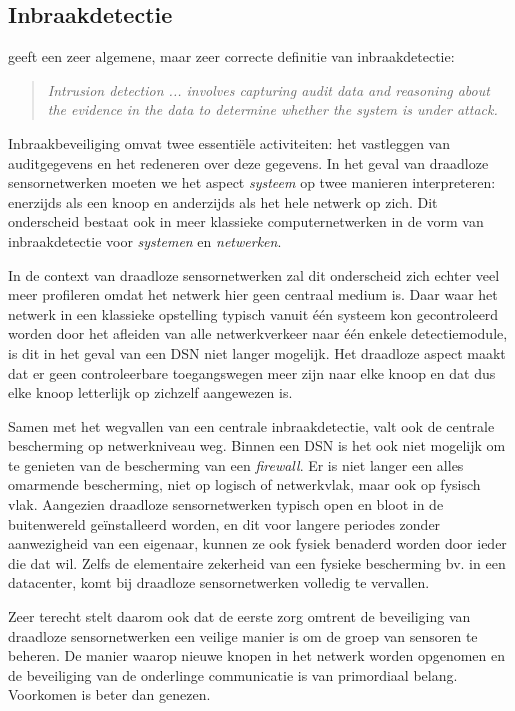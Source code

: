 \subsection{Inbraakdetectie}

\citep{zhang2000intrusion} geeft een zeer algemene, maar zeer correcte
definitie van inbraakdetectie:

\begin{quote}
\emph{Intrusion detection ... involves capturing audit data and reasoning about
the evidence in the data to determine whether the system is under attack.}
\end{quote}

Inbraakbeveiliging omvat twee essenti\"ele activiteiten: het vastleggen van
auditgegevens en het redeneren over deze gegevens. In het geval van draadloze
sensornetwerken moeten we het aspect \emph{systeem} op twee manieren
interpreteren: enerzijds als een knoop en anderzijds als het hele netwerk op
zich. Dit onderscheid bestaat ook in meer klassieke computernetwerken in de
vorm van inbraakdetectie voor \emph{systemen} en \emph{netwerken}.

In de context van draadloze sensornetwerken zal dit onderscheid zich echter
veel meer profileren omdat het netwerk hier geen centraal medium is. Daar waar
het netwerk in een klassieke opstelling typisch vanuit \'e\'en systeem kon
gecontroleerd worden door het afleiden van alle netwerkverkeer naar \'e\'en
enkele detectiemodule, is dit in het geval van een DSN niet langer mogelijk.
Het draadloze aspect maakt dat er geen controleerbare toegangswegen meer zijn
naar elke knoop en dat dus elke knoop letterlijk op zichzelf aangewezen is.

Samen met het wegvallen van een centrale inbraakdetectie, valt ook de centrale
bescherming op netwerkniveau weg. Binnen een DSN is het ook niet mogelijk om te
genieten van de bescherming van een \emph{firewall}. Er is niet langer een
alles omarmende bescherming, niet op logisch of netwerkvlak, maar ook op
fysisch vlak. Aangezien draadloze sensornetwerken typisch open en bloot in de
buitenwereld ge\"installeerd worden, en dit voor langere periodes zonder
aanwezigheid van een eigenaar, kunnen ze ook fysiek benaderd worden door ieder
die dat wil. Zelfs de elementaire zekerheid van een fysieke bescherming bv. in
een datacenter, komt bij draadloze sensornetwerken volledig te vervallen.

Zeer terecht stelt \citep{perrig2004security} daarom ook dat de eerste zorg
omtrent de beveiliging van draadloze sensornetwerken een veilige manier is om
de groep van sensoren te beheren. De manier waarop nieuwe knopen in het netwerk
worden opgenomen en de beveiliging van de onderlinge communicatie is van
primordiaal belang. Voorkomen is beter dan genezen.

